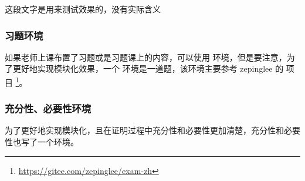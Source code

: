 \documentclass{xdyy-usermanual}
\begin{document}
\begin{latexcode}
    \begin{detail}[
      book = {《泛函分析讲义》},  %
      page = {103},               %
      author = {许全华},          %
      edition = {第一版},         %
      year = {2017},              %
      original = {                %
        ...
      }
    ]
      这段文字是用来测试效果的，没有实际含义
    \end{detail}
\end{latexcode}



\subsubsection{ 习题环境  }

如果老师上课布置了习题或是习题课上的内容，可以使用  环境，但是要注意，为了更好地实现模块化效果，一个  环境是一道题，该环境主要参考 zepinglee 的  项目 \footnote{ \url{https://gitee.com/zepinglee/exam-zh}}。



\subsubsection{ 充分性、必要性环境  }

为了更好地实现模块化，且在证明过程中充分性和必要性更加清楚，充分性和必要性也写了一个环境。
\end{document}
